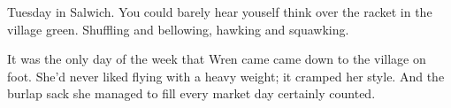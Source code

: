 Tuesday in Salwich.
You could barely hear youself think over the racket in the village green.
Shuffling and bellowing, hawking and squawking.

It was the only day of the week that Wren came came down to the village on foot.
She'd never liked flying with a heavy weight; it cramped her style.
And the burlap sack she managed to fill every market day certainly counted.

